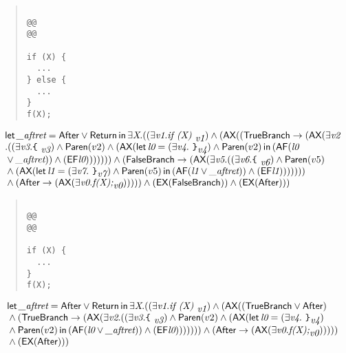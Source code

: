 \documentclass{article}
\newcommand{\AX}{\mbox{\sf{AX}}}
\newcommand{\EX}{\mbox{\sf{EX}}}
\newcommand{\AF}{\mbox{\sf{AF}}}
\newcommand{\EF}{\mbox{\sf{EF}}}
\newcommand{\mita}[1]{\mbox{\it{{#1}}}}
\newcommand{\msf}[1]{\mbox{\sf{{#1}}}}
\newcommand{\ttlb}{\mbox{\tt \char'173}}
\newcommand{\ttrb}{\mbox{\tt \char'175}}
\begin{document}
\begin{quote}\begin{verbatim}

@@
@@

if (X) {
  ...
} else {
  ...
}
f(X);
\end{verbatim}\end{quote}

\[\begin{array}{l}
\mita{\sf{let}} \, \mita{\_aftret} = \msf{After} \vee \msf{Return} \, \mita{\sf{in}} \, \exists \mita{X} . ((\exists \mita{v1} . \mita{if (X) }_{\mita{v1}}) \wedge (\AX((\msf{TrueBranch} \rightarrow (\AX(\exists \mita{v2}\\\mbox{} . ((\exists \mita{v3} . \mita{{\ttlb}
  }_{\mita{v3}}) \wedge \msf{Paren}(v2) \wedge (\AX(\mita{\sf{let}} \, \mita{l0} = (\exists \mita{v4} . \mita{
{\ttrb}}_{\mita{v4}}) \wedge \msf{Paren}(v2) \, \mita{\sf{in}} \, (\AF(\mita{l0}\\\mbox{} \vee \mita{\_aftret})) \wedge (\EF\mita{l0})
)))))) \wedge (\msf{FalseBranch} \rightarrow (\AX(\exists \mita{v5} . ((\exists \mita{v6} . \mita{{\ttlb}
  }_{\mita{v6}}) \wedge \msf{Paren}(v5)\\\mbox{} \wedge (\AX(\mita{\sf{let}} \, \mita{l1} = (\exists \mita{v7} . \mita{
{\ttrb}}_{\mita{v7}}) \wedge \msf{Paren}(v5) \, \mita{\sf{in}} \, (\AF(\mita{l1} \vee \mita{\_aftret})) \wedge (\EF\mita{l1})
))))))\\\mbox{} \wedge (\msf{After} \rightarrow (\AX(\exists \mita{v0} . \mita{f(X);}_{\mita{v0}}))))) \wedge (\EX(\msf{FalseBranch})) \wedge (\EX(\msf{After})))

\end{array}\]

\begin{quote}\begin{verbatim}

@@
@@

if (X) {
  ...
}
f(X);
\end{verbatim}\end{quote}

\[\begin{array}{l}
\mita{\sf{let}} \, \mita{\_aftret} = \msf{After} \vee \msf{Return} \, \mita{\sf{in}} \, \exists \mita{X} . ((\exists \mita{v1} . \mita{if (X) }_{\mita{v1}}) \wedge (\AX((\msf{TrueBranch} \vee \msf{After})\\\mbox{} \wedge (\msf{TrueBranch} \rightarrow (\AX(\exists \mita{v2} . ((\exists \mita{v3} . \mita{{\ttlb}
  }_{\mita{v3}}) \wedge \msf{Paren}(v2) \wedge (\AX(\mita{\sf{let}} \, \mita{l0} = (\exists \mita{v4} . \mita{
{\ttrb}}_{\mita{v4}})\\\mbox{} \wedge \msf{Paren}(v2) \, \mita{\sf{in}} \, (\AF(\mita{l0} \vee \mita{\_aftret})) \wedge (\EF\mita{l0})
)))))) \wedge (\msf{After} \rightarrow (\AX(\exists \mita{v0} . \mita{f(X);}_{\mita{v0}})))))\\\mbox{} \wedge (\EX(\msf{After})))

\end{array}\]
\end{document}
